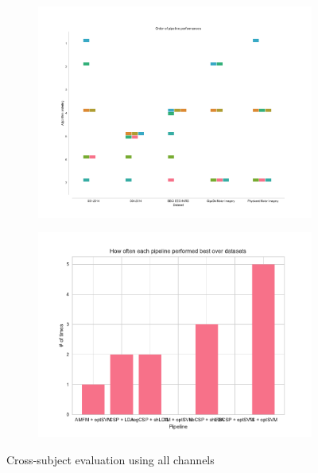 \begin{figure}
    \begin{subfigure}[h]{0.45\textwidth}
        \includegraphics[width=\textwidth]{./Figures/ordering.pdf}
    \end{subfigure}
    \begin{subfigure}[h]{0.45\textwidth}
        \includegraphics[width=\textwidth]{./Figures/summary.pdf}
    \end{subfigure}
    \caption{Cross-subject evaluation using all channels}
\end{figure}
     
